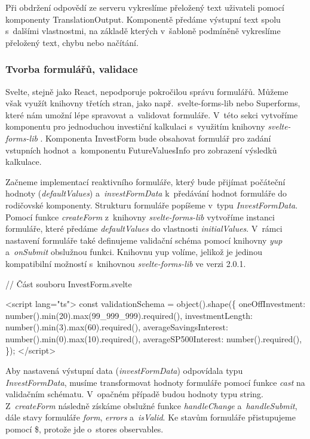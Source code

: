 Při obdržení odpovědí ze serveru vykreslíme přeložený text uživateli pomocí komponenty TranslationOutput. 
Komponentě předáme výstupní text spolu s~dalšími vlastnostmi, na základě kterých v~šabloně podmíněně vykreslíme přeložený text, chybu nebo načítání.

\subsubsection*{Tvorba formulářů, validace}

Svelte, stejně jako React, nepodporuje pokročilou správu formulářů. Můžeme však využít knihovny třetích stran, jako např.~svelte-forms-lib nebo Superforms, které nám umožní lépe spravovat a~validovat formuláře. 
V~této sekci vytvoříme komponentu pro jednoduchou investiční kalkulaci s~využitím knihovny \emph{svelte-forms-lib} \cite{svelteformslib}. 
Komponenta InvestForm bude obsahovat formulář pro zadání vstupních hodnot a~komponentu FutureValuesInfo pro zobrazení výsledků kalkulace.

Začneme implementací reaktivního formuláře, který bude přijímat počáteční hodnoty (\emph{defaultValues}) a~\emph{investFormData} k~předávání hodnot formuláře do rodičovské komponenty. 
Strukturu formuláře popíšeme v~typu \emph{InvestFormData}. Pomocí funkce \emph{createForm} z~knihovny \emph{svelte-forms-lib} vytvoříme instanci formuláře, které předáme \emph{defaultValues} do vlastnosti \emph{initialValues}. 
V~rámci nastavení formuláře také definujeme validační schéma pomocí knihovny \emph{yup} \cite{yuplibrary} a~\emph{onSubmit} obslužnou funkci. 
Knihovnu yup volíme, jelikož je jedinou kompatibilní možností s~knihovnou \emph{svelte-forms-lib} ve verzi 2.0.1. 

\begin{prog}
// Část souboru InvestForm.svelte

<script lang="ts">
  const validationSchema = object().shape(\{
    oneOffInvestment: number().min(20).max(99_999_999).required(),
    investmentLength: number().min(3).max(60).required(),
    averageSavingsInterest: number().min(0).max(10).required(),
    averageSP500Interest: number().required(),
  \});
</script>
\end{prog}

Aby nastavená výstupní data (\emph{investFormData}) odpovídala typu \emph{InvestFormData}, musíme transformovat hodnoty formuláře pomocí funkce \emph{cast} na validačním schématu. V~opačném případě budou hodnoty typu string. 
Z~\emph{createForm} následně získáme obslužné funkce \emph{handleChange} a~\emph{handleSubmit}, dále stavy formuláře \emph{form}, \emph{errors} a~\emph{isValid}. Ke stavům formuláře přistupujeme pomocí \$, protože jde o~stores observables.

